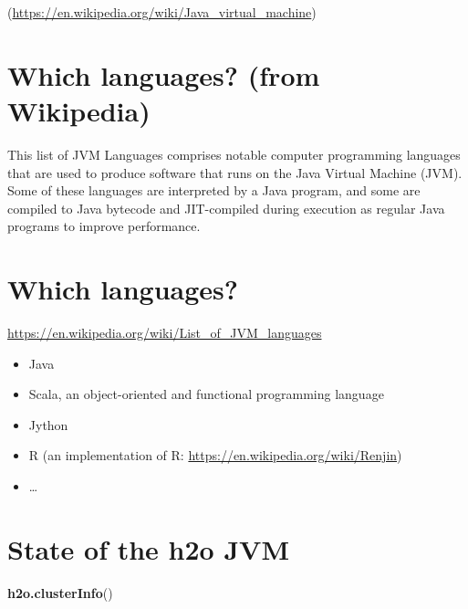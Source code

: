 \documentclass[]{book}
\newenvironment{Shaded}{\begin{snugshade}}{\end{snugshade}}
\newcommand{\KeywordTok}[1]{\textcolor[rgb]{0.13,0.29,0.53}{\textbf{#1}}}
\newcommand{\NormalTok}[1]{#1}
\providecommand{\tightlist}{%
  \setlength{\itemsep}{0pt}\setlength{\parskip}{0pt}}
\theoremstyle{definition}
\theoremstyle{definition}
\theoremstyle{definition}
\theoremstyle{remark}
\begin{document}
(\url{https://en.wikipedia.org/wiki/Java_virtual_machine})

\section{Which languages? (from
Wikipedia)}\label{which-languages-from-wikipedia}

This list of JVM Languages comprises notable computer programming
languages that are used to produce software that runs on the Java
Virtual Machine (JVM). Some of these languages are interpreted by a Java
program, and some are compiled to Java bytecode and JIT-compiled during
execution as regular Java programs to improve performance.

\section{Which languages?}\label{which-languages}

\url{https://en.wikipedia.org/wiki/List_of_JVM_languages}

\begin{itemize}
\tightlist
\item
  Java
\item
  Scala, an object-oriented and functional programming language
\item
  Jython
\item
  R (an implementation of R: \url{https://en.wikipedia.org/wiki/Renjin})
\item
  \ldots{}
\end{itemize}

\section{State of the h2o JVM}\label{state-of-the-h2o-jvm}

\begin{Shaded}
\begin{Highlighting}[]
\KeywordTok{h2o.clusterInfo}\NormalTok{()}
\end{Highlighting}
\end{Shaded}
\end{document}

